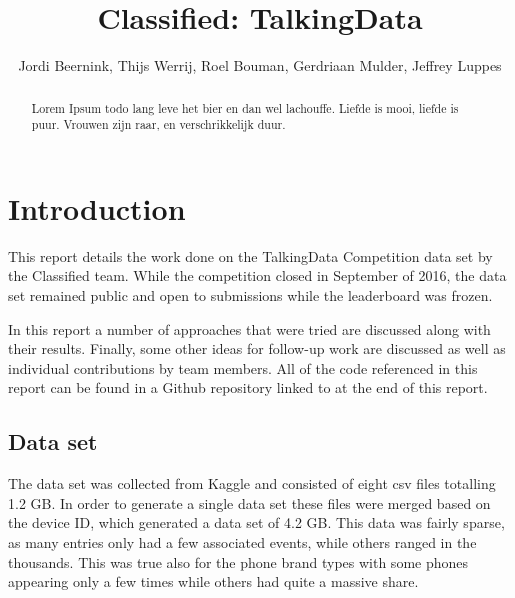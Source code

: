 \documentclass[runningheads,a4paper]{llncs}
\begin{document}
\mainmatter 

\title{Classified: TalkingData}


\author{Jordi Beernink, Thijs Werrij, Roel Bouman, Gerdriaan Mulder, Jeffrey Luppes}



\tocauthor{{}}

\maketitle

\begin{abstract}
Lorem Ipsum todo lang leve het bier en dan wel lachouffe. Liefde is mooi, liefde is puur. Vrouwen zijn raar, en verschrikkelijk duur. 
\end{abstract}

\medskip

\begingroup
\let\clearpage\relax
\tableofcontents
{}
\endgroup

\medskip
\medskip

\section{Introduction}
This report details the work done on the TalkingData Competition data set by the Classified team. While the competition closed in September of 2016,  the data set remained public and open to submissions while the leaderboard was frozen.

In this report a number of approaches that were tried are discussed along with their results. Finally, some other ideas for follow-up work are discussed as well as individual contributions by team members. All of the code referenced in this report can be found in a Github repository linked to at the end of this report. 

\subsection{Data set}
The data set was collected from Kaggle and consisted of eight csv files totalling 1.2 GB. In order to generate a single data set these files were merged based on the device ID, which generated a data set of 4.2 GB. This data was fairly sparse, as many entries only had a few associated events, while others ranged in the thousands. This was true also for the phone brand types with some phones appearing only a few times while others had quite a massive share. 
\medskip
\end{document}
